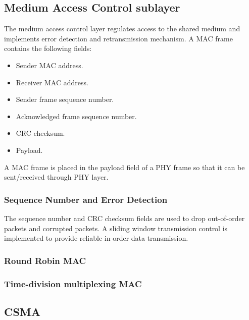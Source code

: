 \subsection{Medium Access Control sublayer}
The medium access control layer regulates access to the shared medium and implements error detection and retransmission mechanism.
A MAC frame contains the following fields:
\begin{itemize}
	\item Sender MAC address.
	\item Receiver MAC address.
	\item Sender frame sequence number.
	\item Acknowledged frame sequence number.
	\item CRC checksum.
	\item Payload.
\end{itemize}
A MAC frame is placed in the payload field of a PHY frame so that it can be sent/received through PHY layer.

\subsubsection{Sequence Number and Error Detection}
The sequence number and CRC checksum fields are used to drop out-of-order packets and corrupted packets.
A sliding window transmission control is implemented to provide reliable in-order data transmission.

\subsubsection{Round Robin MAC}

\subsubsection{Time-division multiplexing MAC}

\subsection{CSMA}
